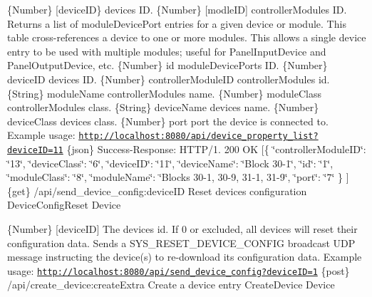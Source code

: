 \{Number\} \mbox{[}device\+ID\} device\textquotesingle{}s ID.  \{Number\} \mbox{[}modle\+ID\mbox{]} controller\+Module\textquotesingle{}s ID.  Returns a list of module\+Device\+Port entries for a given device or module. This table cross-\/references a device to one or more modules. This allows a single device entry to be used with multiple modules; useful for Panel\+Input\+Device and Panel\+Output\+Device, etc.  \{Number\} id module\+Device\+Port\textquotesingle{}s ID.  \{Number\} device\+ID device\textquotesingle{}s ID.  \{Number\} controller\+Module\+ID controller\+Module\textquotesingle{}s id.  \{String\} module\+Name controller\+Module\textquotesingle{}s name.  \{Number\} module\+Class controller\+Module\textquotesingle{}s class.  \{String\} device\+Name device\textquotesingle{}s name.  \{Number\} device\+Class device\textquotesingle{}s class.  \{Number\} port port the device is connected to.  Example usage\+: \href{http://localhost:8080/api/device_property_list?deviceID=11}{\tt http\+://localhost\+:8080/api/device\+\_\+property\+\_\+list?device\+I\+D=11}  \{json\} Success-\/\+Response\+: H\+T\+T\+P/1. 200 OK \mbox{[}\{ \char`\"{}controller\+Module\+I\+D\char`\"{}\+: \char`\"{}13\char`\"{}, \char`\"{}device\+Class\char`\"{}\+: \char`\"{}6\char`\"{}, \char`\"{}device\+I\+D\char`\"{}\+: \char`\"{}11\char`\"{}, \char`\"{}device\+Name\char`\"{}\+: \char`\"{}\+Block 30-\/1\char`\"{}, \char`\"{}id\char`\"{}\+: \char`\"{}1\char`\"{}, \char`\"{}module\+Class\char`\"{}\+: \char`\"{}8\char`\"{}, \char`\"{}module\+Name\char`\"{}\+: \char`\"{}\+Blocks 30-\/1, 30-\/9, 31-\/1, 31-\/9\char`\"{}, \char`\"{}port\char`\"{}\+: \char`\"{}7\char`\"{} \} \mbox{]}  \{get\} /api/send\+\_\+device\+\_\+config\+:device\+ID Reset device\textquotesingle{}s configuration  Device\+Config\+Reset  Device

\{Number\} \mbox{[}device\+ID\mbox{]} The device\textquotesingle{}s id. If 0 or excluded, all devices will reset their configuration data.  Sends a S\+Y\+S\+\_\+\+R\+E\+S\+E\+T\+\_\+\+D\+E\+V\+I\+C\+E\+\_\+\+C\+O\+N\+F\+IG broadcast U\+DP message instructing the device(s) to re-\/download its configuration data.  Example usage\+: \href{http://localhost:8080/api/send_device_config?deviceID=1}{\tt http\+://localhost\+:8080/api/send\+\_\+device\+\_\+config?device\+I\+D=1}  \{post\} /api/create\+\_\+device\+:create\+Extra Create a device entry  Create\+Device  Device

